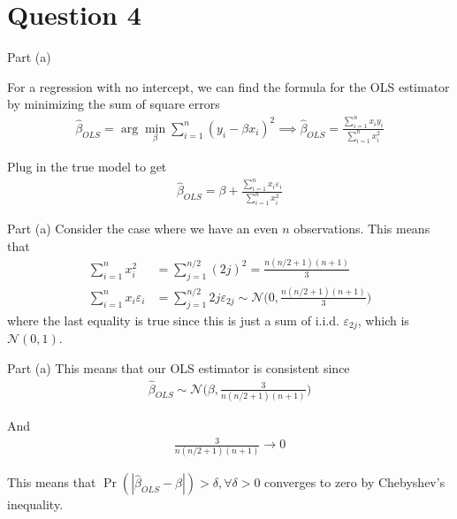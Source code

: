 \section{Question 4}

\begin{frame}{Part (a)}

   For a regression with no intercept, we can find the formula for the OLS estimator by minimizing the sum of square errors
   \begin{align*}
       \hat{\beta}_{OLS} = \arg \min_\beta \sum_{i=1}^n (y_i - \beta x_i)^2 \implies \hat{\beta}_{OLS} = \frac{\sum_{i=1}^n x_i y_i}{\sum_{i=1}^n x_i^2}
   \end{align*}

   Plug in the true model to get
   \begin{align*}
       \hat{\beta}_{OLS} = \beta + \frac{\sum_{i=1}^n x_i \varepsilon_i}{\sum_{i=1}^n x_i^2}
   \end{align*}
   
\end{frame}

\begin{frame}{Part (a)}
    Consider the case where we have an even $n$ observations. This means that
    \begin{align*}
        \sum_{i=1}^n x_i^2 &= \sum_{j=1}^{n/2} (2 j)^2 = \frac{n (n/2 + 1)(n+1)}{3}
        \\
        \sum_{i=1}^n x_i \varepsilon_i &= \sum_{j=1}^{n/2} 2j \varepsilon_{2j} \sim \mathcal{N} \Biggr( 0, \frac{n (n/2 + 1)(n+1)}{3} \Biggr)
    \end{align*}
    where the last equality is true since this is just a sum of i.i.d. $\varepsilon_{2j}$, which is $\mathcal{N}(0,1)$.
\end{frame}

\begin{frame}{Part (a)}
    This means that our OLS estimator is consistent since
    \begin{align*}
        \hat{\beta}_{OLS} \sim \mathcal{N} \Biggr( \beta, \frac{3}{n (n/2 + 1)(n+1)} \Biggr)
    \end{align*}

    And
    \begin{align*}
        \frac{3}{n (n/2 + 1)(n+1)} \rightarrow 0
    \end{align*}
    
    This means that $\operatorname{Pr}(| \hat{\beta}_{OLS} - \beta |) > \delta, \forall \delta > 0$ converges to zero by Chebyshev's inequality.
    
\end{frame}

